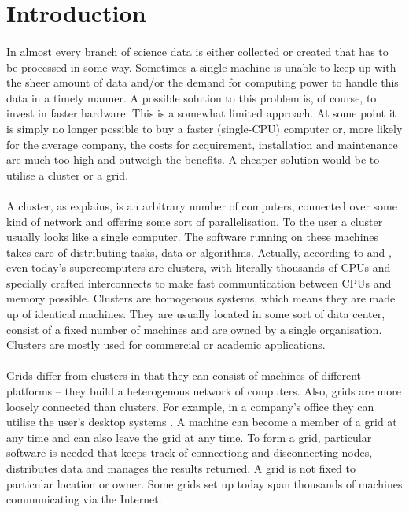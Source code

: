 \section{Introduction}
\paragraph{}
In almost every branch of science data is either collected or created that has to be processed in some way. Sometimes a single machine is unable to keep up with the sheer amount of data and/or the demand for computing power to handle this data in a timely manner. A possible solution to this problem is, of course, to invest in faster hardware. This is a somewhat limited approach. At some point it is simply no longer possible to buy a faster (single-CPU) computer or, more likely for the average company, the costs for acquirement, installation and maintenance are much too high and outweigh the benefits. A cheaper solution would be to utilise a cluster or a grid.
\paragraph{}
A cluster, as  explains, is an arbitrary number of computers, connected over some kind of network and offering some sort of parallelisation. To the user a cluster usually looks like a single computer. The software running on these machines takes care of distributing tasks, data or algorithms. Actually, according to  and , even today's supercomputers are clusters, with literally thousands of CPUs and specially crafted interconnects to make fast communtication between CPUs and memory possible. Clusters are homogenous systems, which means they are made up of identical machines. They are usually located in some sort of data center, consist of a fixed number of machines and are owned by a single organisation. Clusters are mostly used for commercial or academic applications.
\paragraph{}
Grids differ from clusters in that they can consist of machines of different platforms -- they build a heterogenous network of computers. Also, grids are more loosely connected than clusters. For example, in a company's office they can utilise the user's desktop systems \cite{wikipedia005}. A machine can become a member of a grid at any time and can also leave the grid at any time. To form a grid, particular software is needed that keeps track of connectiong and disconnecting nodes, distributes data and manages the results returned. A grid is not fixed to particular location or owner. Some grids set up today span thousands of machines communicating via the Internet.
